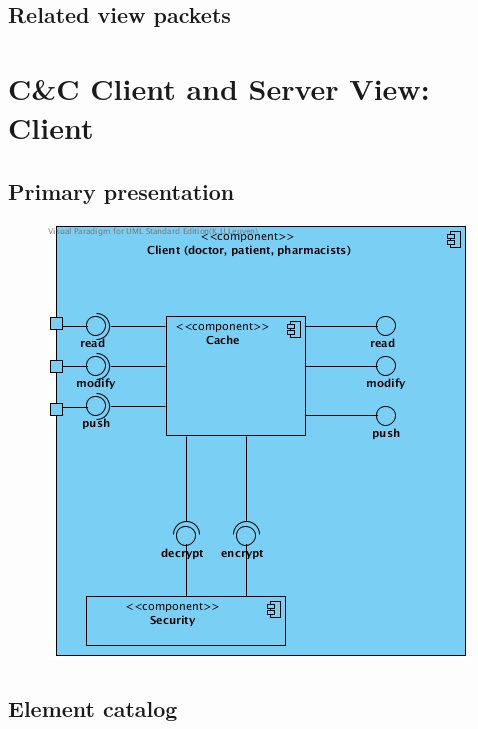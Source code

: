 \documentclass[a4paper,10pt]{paper}
\begin{document}
\subsection{Related view packets}



\section{C\&C Client and Server View: Client}
\label{Client and Server View: Client}

\subsection{Primary presentation}

\begin{center}
    \begin{figure}
      \includegraphics[width=\textwidth]{../images/ClientServer_Client.png}
    \end{figure}
  \end{center}

\subsection{Element catalog}
\end{document}
